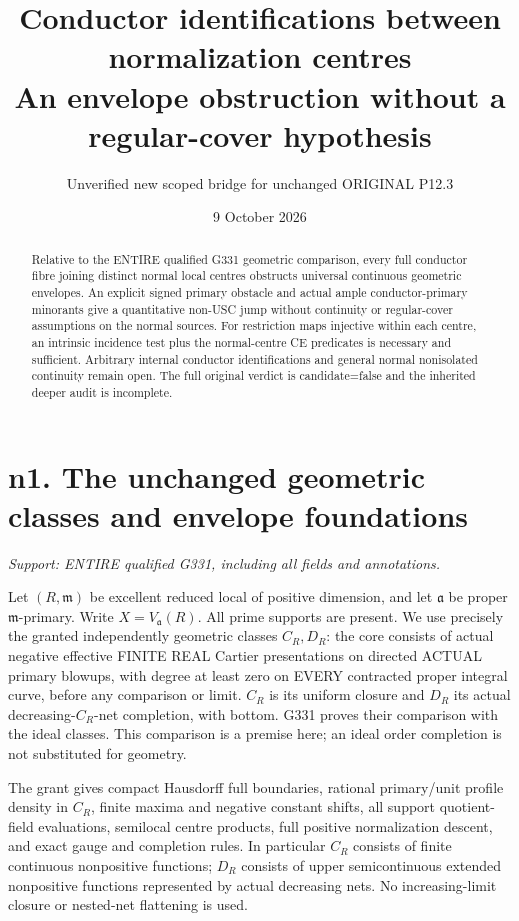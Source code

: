 \documentclass[11pt]{article}
\title{Conductor identifications between normalization centres\\
An envelope obstruction without a regular-cover hypothesis}
\author{Unverified new scoped bridge for unchanged ORIGINAL P12.3}
\date{9 October 2026}
\begin{document}
\maketitle
\begin{abstract}
Relative to the ENTIRE qualified G331 geometric comparison, every full
conductor fibre joining distinct normal local centres obstructs universal
continuous geometric envelopes. An explicit signed primary obstacle and
actual ample conductor-primary minorants give a quantitative non-USC jump
without continuity or regular-cover assumptions on the normal sources.
For restriction maps injective within each centre, an intrinsic incidence
test plus the normal-centre CE predicates is necessary and sufficient.
Arbitrary internal conductor identifications and general normal
nonisolated continuity remain open. The full original verdict is
candidate=false and the inherited deeper audit is incomplete.
\end{abstract}
\tableofcontents

\section{n1. The unchanged geometric classes and envelope foundations}
\textit{Support: ENTIRE qualified G331, including all fields and annotations.}

Let $(R,\mathfrak m)$ be excellent reduced local of positive dimension,
and let $\mathfrak a$ be proper $\mathfrak m$-primary. Write
$X=V_{\mathfrak a}(R)$. All prime supports are present. We use precisely
the granted independently geometric classes $C_R,D_R$: the core consists
of actual negative effective FINITE REAL Cartier presentations on directed
ACTUAL primary blowups, with degree at least zero on EVERY contracted
proper integral curve, before any comparison or limit. $C_R$ is its uniform
closure and $D_R$ its actual decreasing-$C_R$-net completion, with bottom.
G331 proves their comparison with the ideal classes. This comparison is a
premise here; an ideal order completion is not substituted for geometry.

The grant gives compact Hausdorff full boundaries, rational primary/unit
profile density in $C_R$, finite maxima and negative constant shifts, all
support quotient-field evaluations, semilocal centre products, full positive
normalization descent, and exact gauge and completion rules. In particular
$C_R$ consists of finite continuous nonpositive functions; $D_R$ consists
of upper semicontinuous extended nonpositive functions represented by actual
decreasing nets. No increasing-limit closure or nested-net flattening is used.
\end{document}
